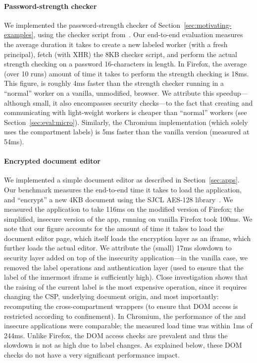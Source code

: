 \paragraph{Password-strength checker}
%
We implemented the password-strength checker of
Section~\ref{sec:motivating-examples}, using the checker script
from~\cite{checker1}.
%
Our end-to-end evaluation measures the average duration it takes to
create a new labeled worker (with a fresh principal), fetch (with XHR)
the 8KB checker script, and perform the actual strength
checking on a password 16-characters in length.
%
%
In Firefox, the average (over 10 runs) amount of time it takes to
perform the strength checking is 18ms.
%
This figure, is roughly 4ms faster than the strength checker 
running in a ``normal'' worker on a vanilla, unmodified, browser.
%
We attribute this speedup---although small, it also encompasses
security checks---to the fact that creating and communicating with
light-weight workers is cheaper than ``normal'' workers (see
Section~\ref{sec:eval:micro}).
%
Similarly, the Chromium implementation (which solely uses the
compartment labels) is 5ms faster than the vanilla version (measured
at 54ms).


\paragraph{Encrypted document editor}

We implemented a simple document editor as described in
Section~\ref{sec:apps}.
%
Our benchmark measures the end-to-end time it takes to load the
application, and ``encrypt'' a new 4KB document using
the SJCL AES-128 library~\cite{sjcl}.
%
We measured the \sys{} application to take 116ms on the modified
version of Firefox; the simplified, insecure version of the app,
running on vanilla Firefox took 100ms.
%
We note that our figure accounts for the amount of time it takes to
load the document editor page, which itself loads the encryption layer
as an iframe, which further loads the actual editor.
%
We attribute the (small) 17ms slowdown to security layer added on top
of the insecurity application---in the vanilla case, we removed the
label operations and authentication layer (used to ensure that the
label of the innermost iframe is sufficiently high).
%
Close investigation shows that the raising of the current label is the
most expensive operation, since it requires changing the CSP,
underlying document origin, and most importantly: recomputing the
cross-compartment wrappers (to ensure that DOM access is restricted
according to confinement).
%
In Chromium, the performance of the \sys{} and insecure applications
were comparable; the measured load time was within 1ms of 244ms.
%
Unlike Firefox, the DOM access checks are prevalent and thus the
slowdown is not as high due to label changes.
%
As explained below, these DOM checks do not have a very significant
performance impact.


